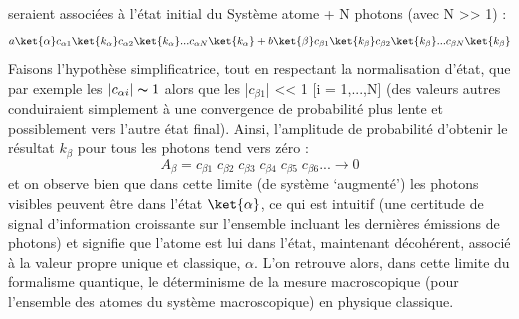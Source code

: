 seraient associées à l’état initial du Système atome + N photons (avec N >> 1) :
\[
a\ket{\alpha}c_{\alpha 1}\ket{k_\alpha}c_{\alpha 2}\ket{k_\alpha}...c_{\alpha N}\ket{k_\alpha}+
b\ket{\beta}c_{\beta 1}\ket{k_\beta}c_{\beta 2}\ket{k_\beta}...c_{\beta N}\ket{k_\beta}
\]
Faisons l’hypothèse simplificatrice, tout en respectant la normalisation d’état, que par
exemple les $|c_{\alpha i}| \thicksim 1$ alors que les |$c_{\beta 1}$| <{<} 1 [i = 1,...,N] (des valeurs
 autres conduiraient
simplement à une convergence de probabilité plus lente et possiblement vers l’autre état
final). Ainsi, l’amplitude de probabilité d’obtenir le résultat $k_\beta$ pour tous les
 photons tend vers zéro :
\[
A_\beta=c_{\beta 1}\;c_{\beta 2}\;c_{\beta 3}\;c_{\beta 4}\;c_{\beta 5}\;
c_{\beta 6}... \rightarrow 0
\]
et on observe bien que dans cette limite (de système ‘augmenté’) les photons visibles
peuvent être dans l’état $\ket{\alpha}$, ce qui est intuitif (une certitude de signal
 d’information
croissante sur l’ensemble incluant les dernières émissions de photons) et signifie que
l’atome est lui dans l’état, maintenant décohérent,
associé à la valeur propre unique et classique, $\alpha$. L’on retrouve alors, dans cette
 limite du
formalisme quantique, le déterminisme de la mesure macroscopique (pour l’ensemble des
atomes du système macroscopique) en physique classique.
